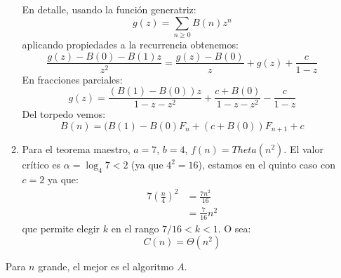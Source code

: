 \documentclass[english, spanish, fleqn]{article}
\begin{document}
\begin{enumerate}
\begin{enumerate}[label = \textbf{Algoritmo \Alph*:}]
      En detalle,
      usando la función generatriz:
      \begin{equation*}
	g(z)
	  = \sum_{n \ge 0} B(n) z^n
      \end{equation*}
      aplicando propiedades a la recurrencia obtenemos:
      \begin{equation*}
	\frac{g(z) - B(0) - B(1) z}{z^2}
	  = \frac{g(z) - B(0)}{z} + g(z) + \frac{c}{1 - z}
      \end{equation*}
      En fracciones parciales:
      \begin{equation*}
	g(z)
	  = \frac{(B(1) - B(0)) z}{1 - z - z^2}
	      + \frac{c + B(0)}{1 - z - z^2}
	      - \frac{c}{1 - z}
      \end{equation*}
      Del torpedo vemos:
      \begin{equation*}
	B(n)
	  = (B(1) - B(0) F_n + (c + B(0)) F_{n + 1} + c
      \end{equation*}
    \item %
      Para el teorema maestro,
      \(a = 7\), \(b = 4\), \(f(n) = Theta(n^2)\).
      El valor crítico es \(\alpha = \log_4 7 < 2\)
      (ya que \(4^2 = 16\)),
      estamos en el quinto caso con \(c = 2\)
      ya que:
      \begin{align*}
	7 \left( \frac{n}{4} \right)^2
	  &= \frac{7 n^2}{16} \\
	  &= \frac{7}{16} n^2
      \end{align*}
      que permite elegir \(k\) en el rango \(7 / 16 < k < 1\).
      O sea:
      \begin{equation*}
	C(n)
	  = \Theta(n^2)
      \end{equation*}
    \end{enumerate}
    Para \(n\) grande,
    el mejor es el algoritmo \(A\).


\end{enumerate}
\end{document}
